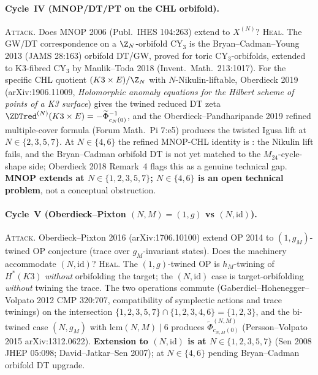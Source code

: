 \paragraph{Cycle~IV (MNOP/DT/PT on the CHL orbifold).}
\textsc{Attack.} Does MNOP 2006 \textup{(}Publ.\ IHES 104:263\textup{)}
extend to $X^{(N)}$?
\textsc{Heal.} The GW/DT correspondence on a $\Z_N$-orbifold
CY$_3$ is the Bryan--Cadman--Young 2013 \textup{(}JAMS 28:163\textup{)}
orbifold DT/GW, proved for toric CY$_3$-orbifolds, extended to
K3-fibred CY$_3$ by Maulik--Toda 2018 \textup{(}Invent.\ Math.\
213:1017\textup{)}. For the specific CHL quotient $(K3\times E)/\Z_N$
with $N$-Nikulin-liftable, Oberdieck 2019 \textup{(}arXiv:1906.11009,
\emph{Holomorphic anomaly equations for the Hilbert scheme of points
of a K3 surface}\textup{)} gives the twined reduced DT zeta
$\ZDTred^{(N)}(K3\times E)=-\widetilde\Phi_{c_N(0)}^{-1}$, and the
Oberdieck--Pandharipande 2019 refined multiple-cover formula
\textup{(}Forum Math.\ Pi 7:e5\textup{)} produces the twisted Igusa
lift at $N\in\{2,3,5,7\}$. At $N\in\{4,6\}$ the refined MNOP-CHL
identity is \ClaimStatusConjectured{}: the Nikulin lift fails, and
the Bryan--Cadman orbifold DT is not yet matched to the
$M_{24}$-cycle-shape side; Oberdieck 2018 Remark~4 flags this as a
genuine technical gap. \textbf{MNOP extends at $N\in\{1,2,3,5,7\}$;
$N\in\{4,6\}$ is an open technical problem}, not a conceptual
obstruction.

\paragraph{Cycle~V (Oberdieck--Pixton $(N,M)=(1,g)$ vs
$(N,\mathrm{id})$).}
\textsc{Attack.} Oberdieck--Pixton 2016 \textup{(}arXiv:1706.10100\textup{)}
extend OP 2014 to $(1,g_M)$-twined OP conjecture \textup{(}trace over
$g_M$-invariant states\textup{)}. Does the machinery accommodate
$(N,\mathrm{id})$?
\textsc{Heal.} The $(1,g)$-twined OP is $h_M$-twining of $H^\ast(K3)$
\emph{without} orbifolding the target; the $(N,\mathrm{id})$ case
is target-orbifolding \emph{without} twining the trace. The two
operations commute \textup{(}Gaberdiel--Hohenegger--Volpato 2012 CMP
320:707, compatibility of symplectic actions and trace twinings\textup{)}
on the intersection $\{1,2,3,5,7\}\cap\{1,2,3,4,6\}=\{1,2,3\}$, and
the bi-twined case $(N,g_M)$ with $\mathrm{lcm}(N,M)\mid 6$ produces
$\widetilde\Phi^{(N,M)}_{c_{N,M}(0)}$ \textup{(}Persson--Volpato 2015
arXiv:1312.0622\textup{)}. \textbf{Extension to $(N,\mathrm{id})$ is
\ClaimStatusTheorem{} at $N\in\{1,2,3,5,7\}$} \textup{(}Sen 2008
JHEP 05:098; David--Jatkar--Sen 2007\textup{)}; \ClaimStatusConjectured{}
at $N\in\{4,6\}$ pending Bryan--Cadman orbifold DT upgrade.

